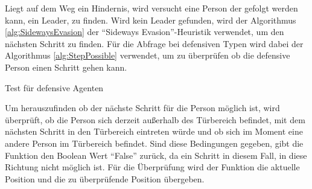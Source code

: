 Liegt auf dem Weg ein Hindernis, wird versucht eine Person der gefolgt werden kann, ein Leader, zu finden. Wird kein Leader gefunden, wird der Algorithmus \ref{alg:SidewaysEvasion} der "`Sideways Evasion"'-Heuristik verwendet, um den nächsten Schritt zu finden. Für die Abfrage bei defensiven Typen wird dabei der Algorithmus \ref{alg:StepPossible} verwendet, um zu überprüfen ob die defensive Person einen Schritt gehen kann. 
\clearpage
\begin{algorithm} [H]
	\caption{Test für defensive Agenten}
	\label{alg:StepPossible}
	
	 {
		 {
		\Return \False
		}\Else {
		\Return \True
		}
	}
\end{algorithm} 

Um herauszufinden ob der nächste Schritt für die Person möglich ist, wird überprüft, ob die Person sich derzeit außerhalb des Türbereich befindet, mit dem nächsten Schritt in den Türbereich eintreten würde und ob sich im Moment eine andere Person im Türbereich befindet. Sind diese Bedingungen gegeben, gibt die Funktion den Boolean Wert "`False"' zurück, da ein Schritt in diesem Fall, in diese Richtung nicht möglich ist. Für die Überprüfung wird der Funktion die aktuelle Position und die zu überprüfende Position übergeben.

